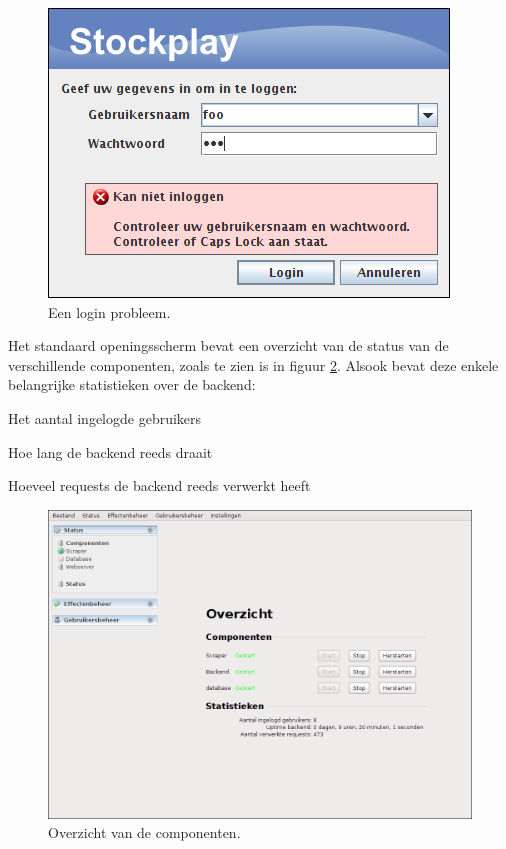\begin{figure}[h!]
	\centering
		\includegraphics[scale=0.75]{images/handleiding/administratie/login-failure}
	\caption{Een login probleem.}
	\label{fig:handl:admin:login-failure}
\end{figure}

Het standaard openingsscherm bevat een overzicht van de status van de verschillende componenten, zoals te zien is in figuur \ref{fig:handl:admin:status-overzicht}.
Alsook bevat deze enkele belangrijke statistieken over de backend:
\begin{enumerate_compact}
\item Het aantal ingelogde gebruikers
\item Hoe lang de backend reeds draait
\item Hoeveel requests de backend reeds verwerkt heeft
\end{enumerate_compact}

\begin{figure}[h!]
	\centering
		\includegraphics[width=\textwidth]{images/handleiding/administratie/status-overzicht}
	\caption{Overzicht van de componenten.}
		\label{fig:handl:admin:status-overzicht}
\end{figure}

